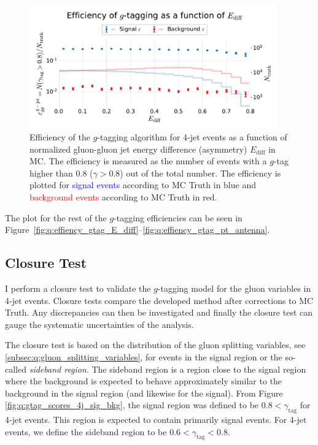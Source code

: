 \begin{figure}
  \centerfloat
  \includegraphics[width=0.95\textwidth, trim=10 10 10 45, clip, page=1]{figures/quarks/efficiency_events-down_sample=1.00-ML_vars=vertex-selection=b-ejet_min=4-n_iter_RS_lgb=99-n_iter_RS_xgb=9-cdot_cut=0.90-version=19-njet=4.pdf}
  \caption[$g$-Tagging Efficiency for 4-Jet Events in MC as a Function of the Normalized Gluon-Gluon Jet Energy Difference Asymmetry $E_\mathrm{diff}$]
          {Efficiency of the $g$-tagging algorithm for 4-jet events as a function of normalized gluon-gluon jet energy difference (asymmetry) $E_\mathrm{diff}$  in MC. The efficiency is measured as the number of events with a $g$-tag higher than 0.8 ($\gamma > 0.8$) out of the total number. The efficiency is plotted for \textcolor{blue}{signal events} according to MC Truth in blue and \textcolor{red}{background events} according to MC Truth in red.
          } 
  \label{fig:q:effiency_gtag_E_diff_non_appendix}
\end{figure}

The plot for the rest of the $g$-tagging efficiencies can be seen in Figure~\ref{fig:q:effiency_gtag_E_diff}--\ref{fig:q:effiency_gtag_pt_antenna}. 

\subsection{Closure Test}
\label{subsec:q:gluon_splitting_closure}

I perform a closure test to validate the $g$-tagging model for the gluon variables in 4-jet events. Closure tests compare the developed method after corrections to MC Truth. Any discrepancies can then be investigated and finally the closure test can gauge the systematic uncertainties of the analysis. 

The closure test is based on the distribution of the gluon splitting variables, see \autoref{subsec:q:gluon_splitting_variables}, for events in the signal region or the so-called \emph{sideband region}. The sideband region is a region close to the signal region where the background is expected to behave approximately similar to the background in the signal region (and likewise for the signal). From Figure \ref{fig:q:gtag_scores_4j_sig_bkg}, the signal region was defined to be $0.8 < \gamma_\mathrm{tag}$ for 4-jet events. This region is expected to contain primarily signal events. For 4-jet events, we define the sideband region to be $0.6 < \gamma_\mathrm{tag} < 0.8$. 

